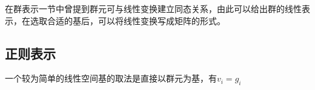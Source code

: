 \begin{issues}
\issueDraft
\end{issues}
在群表示一节中曾提到群元可与线性变换建立同态关系，由此可以给出群的线性表示，在选取合适的基后，可以将线性变换写成矩阵的形式。

\subsection{正则表示}

一个较为简单的线性空间基的取法是直接以群元为基，有$v_i=g_i$

